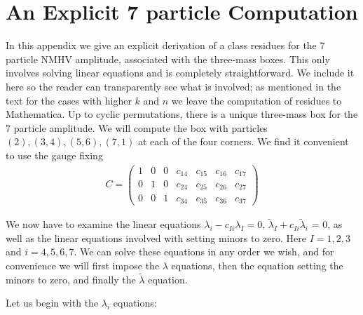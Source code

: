 \documentclass[12pt]{article}
\newcommand{\be}{\begin{eqnarray}}
\newcommand{\ee}{\end{eqnarray}}
\begin{document}
\section{An Explicit 7 particle Computation}

In this appendix we give an explicit derivation of a class residues for the 7 particle NMHV amplitude, associated with the three-mass boxes. This only involves solving linear equations and is completely straightforward. We include it here so the reader can transparently see what is involved; as mentioned in the text for the cases with higher $k$ and $n$ we leave the computation of residues to Mathematica.
Up to cyclic permutations, there is a unique three-mass box for the $7$ particle amplitude.  We will compute the box with particles  $(2),(3,4),(5,6),(7,1)$ at each of the four corners.  We find it convenient to use the gauge fixing
%
\be
C = \left(\begin{array}{ccccccc}
1 & 0 & 0 & c_{14} & c_{15} & c_{16} & c_{17}  \\
0 & 1 & 0 & c_{24} & c_{25} & c_{26} & c_{27}  \\
0 & 0 & 1 & c_{34} & c_{35} & c_{36} & c_{37}   \end{array} \right)
\ee
%

We now have to examine the linear equations $\lambda_i - c_{Ii} \lambda_I = 0, \, \tilde \lambda_I + c_{Ii} \tilde \lambda_i$ = 0, as well as the linear equations involved with setting minors to zero. Here
$I = 1,2,3$ and $i=4,5,6,7$. We can solve these equations in any order we wish, and for convenience we will first impose the $\lambda$ equations, then the equation setting the minors to zero, and finally the $\tilde \lambda$ equation.

Let us begin with the $\lambda_i$ equations:
\end{document}

